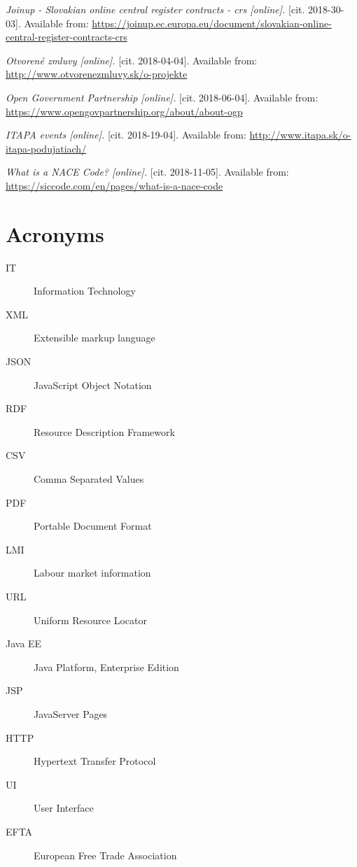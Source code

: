 \documentclass[thesis=B,english]{FITthesis}[2012/06/26]
\begin{document}
{\begin{thebibliography}{9}
\textit{Joinup - Slovakian online central register contracts - crs [online].}
[cit. 2018-30-03]. Available from: \url{https://joinup.ec.europa.eu/document/slovakian-online-central-register-contracts-crs}

\textit{Otvorené zmluvy [online].}
[cit. 2018-04-04]. Available from: \url{http://www.otvorenezmluvy.sk/o-projekte}

\textit{Open Government Partnership [online].}
[cit. 2018-06-04]. Available from: \url{https://www.opengovpartnership.org/about/about-ogp}

\textit{ITAPA events [online].}
[cit. 2018-19-04]. Available from: \url{http://www.itapa.sk/o-itapa-podujatiach/}

\textit{What is a NACE Code? [online].}
[cit. 2018-11-05]. Available from: \url{https://siccode.com/en/pages/what-is-a-nace-code}

\end{thebibliography}

\chapter{Acronyms}
\begin{description}
	\item[IT] Information Technology
	\item[XML] Extensible markup language
	\item[JSON] JavaScript Object Notation
	\item[RDF] Resource Description Framework
	\item[CSV] Comma Separated Values
	\item[PDF] Portable Document Format
	\item[LMI] Labour market information
	\item[URL] Uniform Resource Locator
	\item[Java EE] Java Platform, Enterprise Edition
	\item[JSP] JavaServer Pages
	\item[HTTP] Hypertext Transfer Protocol
	\item[UI] User Interface
	\item[EFTA] European Free Trade Association 
\end{description}

}
\end{document}
